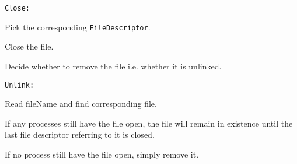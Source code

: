 \documentclass{article}
\begin{document}
\begin{compactitem}
\begin{compactitem}
	\end{compactitem}
\item \texttt{Close:}
	\begin{compactitem}
		\item Pick the corresponding \texttt{FileDescriptor}.
		\item Close the file.
		\item Decide whether to remove the file i.e. whether it is unlinked.
	\end{compactitem}
\item \texttt{Unlink:}
	\begin{compactitem}
		\item Read fileName and find corresponding file.
		\item If any processes still have the file open, the file will remain in existence until the last file descriptor referring to it is closed.
		\item If no process still have the file open, simply remove it.
	\end{compactitem}
\end{compactitem}
\end{document}
